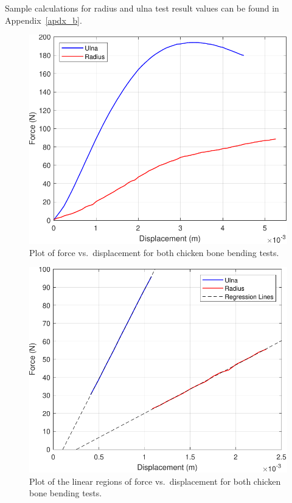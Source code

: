 \documentclass[conference, letterpaper]{IEEEtran}
\begin{document}
    Sample calculations for radius and ulna test result values can be found in Appendix~\ref{apdx_b}.
    \begin{figure}[htbp]
        \centerline{\includegraphics[width = 0.65\linewidth]{chicken_fd.pdf}}
        \caption{Plot of force vs.\ displacement for both chicken bone bending tests.}\label{chicken_fd}
    \end{figure}
    \begin{figure}[htbp]
        \centerline{\includegraphics[width = 0.65\linewidth]{chicken_linear.pdf}}
        \caption{Plot of the linear regions of force vs.\ displacement for both chicken bone bending tests.}\label{chicken_linear}
    \end{figure}
\end{document}
